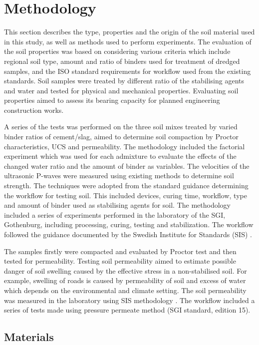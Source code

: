 \documentclass{amestyle}
\begin{document}

\section{Methodology}
This section describes the type, properties and the origin of the soil material used in this study, as well as methods used to perform experiments. The evaluation of the soil properties was based on considering various criteria which include regional soil type, amount and ratio of binders used for treatment of dredged samples, and the ISO standard requirements for workflow used from the existing standards. Soil samples were treated by different ratio of the stabilising agents and water and tested for physical and mechanical properties. Evaluating soil properties aimed to assess its bearing capacity for planned engineering construction works.

A series of the tests was performed on the three soil mixes treated by varied binder ratios of cement/slag, aimed to determine soil compaction by Proctor characteristics, UCS and permeability. The methodology included the factorial experiment which was used for each admixture to evaluate the effects of the changed water ratio and the amount of binder as variables. The velocities of the ultrasonic P-waves were measured using existing methods \cite{Lindh202102} to determine soil strength. The techniques were adopted from the standard guidance determining the workflow for testing soil. This included devices, curing time, workflow, type and amount of binder used as stabilising agents for soil. The methodology included a series of experiments performed  in the laboratory of the SGI, Gothenburg, including processing, curing, testing and stabilization. The workflow followed the guidance documented by the Swedish Institute for Standards (SIS) \cite{SIS2017,SIS2018,SIS2019}. 

The samples firstly were compacted and evaluated by Proctor test and then tested for permeability. Testing soil permeability aimed to estimate possible danger of soil swelling caused by the effective stress in a non-stabilised soil. For example, swelling of roads is caused by permeability of soil and excess of water which depends on the environmental and climate setting. The soil permeability was measured in the laboratory using SIS methodology \cite{SIS2019}. The workflow included a series of tests made using pressure permeate method (SGI standard, edition 15).

\subsection{Materials}
\end{document}
